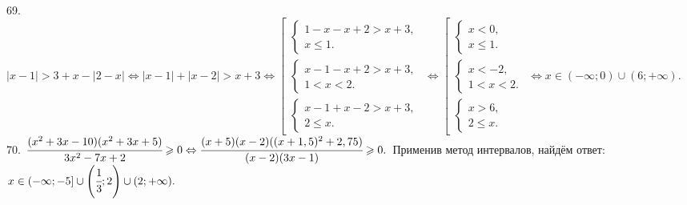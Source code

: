 \documentclass[12pt]{article}
\begin{document}
\begin{figure}[ht!]
\end{figure}\\
69. $|x-1|>3+x-|2-x|\Leftrightarrow |x-1|+|x-2|>x+3\Leftrightarrow\left[\begin{array}{l} \begin{cases} 1-x-x+2>x+3,\\
x\leqslant1.\end{cases}\\ \begin{cases} x-1-x+2>x+3,\\ 1<x<2.\end{cases} \\ \begin{cases} x-1+x-2>x+3,\\ 2\leqslant x.\end{cases}\end{array}\right.\Leftrightarrow
\left[\begin{array}{l} \begin{cases} x<0,\\
x\leqslant1.\end{cases}\\ \begin{cases} x<-2,\\ 1<x<2.\end{cases} \\ \begin{cases} x>6,\\ 2\leqslant x.\end{cases}\end{array}\right.\Leftrightarrow
x\in(-\infty;0)\cup(6;+\infty).$\\
70. $\cfrac{(x^2+3x-10)(x^2+3x+5)}{3x^2-7x+2}\geqslant0\Leftrightarrow\cfrac{(x+5)(x-2)((x+1,5)^2+2,75)}{(x-2)(3x-1)}\geqslant0.$ Применив метод интервалов, найдём ответ: $x\in(-\infty;-5]\cup\left(\cfrac{1}{3};2\right)\cup(2;+\infty).$
\begin{figure}[ht!]
\end{figure}\\
\end{document}
